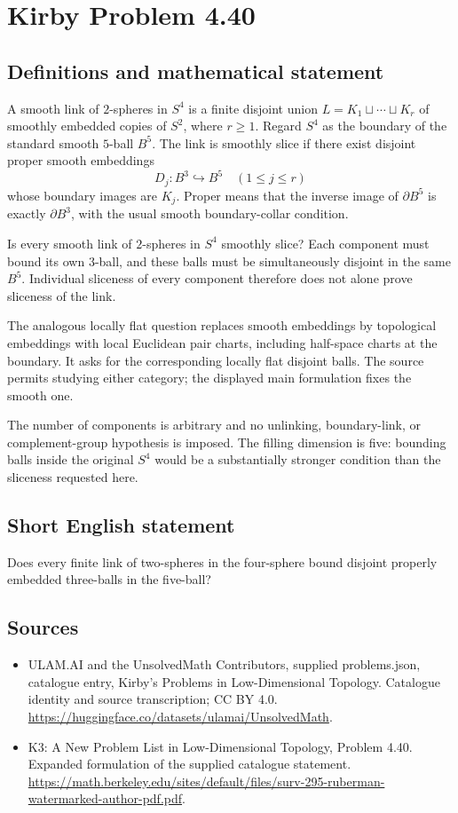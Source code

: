 \documentclass[11pt,a4paper]{article}
\begin{document}
\section*{Kirby Problem 4.40}\label{statement}

\subsection{Definitions and mathematical statement}
A smooth link of $2$-spheres in $S^4$ is a finite disjoint union
$L=K_1\sqcup\cdots\sqcup K_r$ of smoothly embedded copies of $S^2$,
where $r\ge1$. Regard $S^4$ as the boundary of the standard smooth
$5$-ball $B^5$. The link is smoothly slice if there exist disjoint
proper smooth embeddings
\[
 D_j:B^3\hookrightarrow B^5\quad(1\le j\le r)
\]
whose boundary images are $K_j$. Proper means that the inverse image
of $\partial B^5$ is exactly $\partial B^3$, with the usual smooth
boundary-collar condition.

Is every smooth link of $2$-spheres in $S^4$ smoothly slice? Each
component must bound its own $3$-ball, and these balls must be
simultaneously disjoint in the same $B^5$. Individual sliceness of
every component therefore does not alone prove sliceness of the link.

The analogous locally flat question replaces smooth embeddings by
topological embeddings with local Euclidean pair charts, including
half-space charts at the boundary. It asks for the corresponding
locally flat disjoint balls. The source permits studying either
category; the displayed main formulation fixes the smooth one.

The number of components is arbitrary and no unlinking, boundary-link,
or complement-group hypothesis is imposed. The filling dimension is
five: bounding balls inside the original $S^4$ would be a substantially
stronger condition than the sliceness requested here.
\subsection{Short English statement}
Does every finite link of two-spheres in the four-sphere bound disjoint properly embedded three-balls in the five-ball?
\subsection{Sources}
\begin{itemize}
\item[S1] ULAM.AI and the UnsolvedMath Contributors, supplied problems.json, catalogue entry, Kirby's Problems in Low-Dimensional Topology. Catalogue identity and source transcription; CC BY 4.0.
\url{https://huggingface.co/datasets/ulamai/UnsolvedMath}.
\item[S2] K3: A New Problem List in Low-Dimensional Topology, Problem 4.40. Expanded formulation of the supplied catalogue statement.
\url{https://math.berkeley.edu/sites/default/files/surv-295-ruberman-watermarked-author-pdf.pdf}.
\end{itemize}
\end{document}
